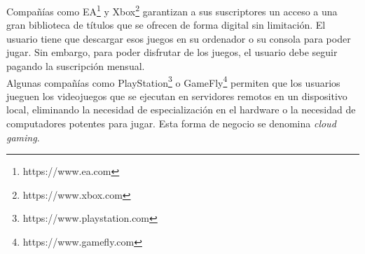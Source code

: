 Compañías como EA\footnote{https://www.ea.com} y Xbox\footnote{https://www.xbox.com} garantizan a sus suscriptores un acceso a una gran biblioteca de títulos que se ofrecen de forma digital sin limitación. El usuario tiene que descargar esos juegos en su ordenador o su consola para poder jugar. Sin embargo, para poder disfrutar de los juegos, el usuario debe seguir pagando la suscripción mensual.\\


Algunas compañías como PlayStation\footnote{https://www.playstation.com} o GameFly\footnote{https://www.gamefly.com} permiten que los usuarios jueguen los videojuegos que se ejecutan en servidores remotos en un dispositivo local, eliminando la necesidad de especialización en el hardware o la necesidad de computadores potentes para jugar. Esta forma de negocio se denomina \textit{cloud gaming}.












